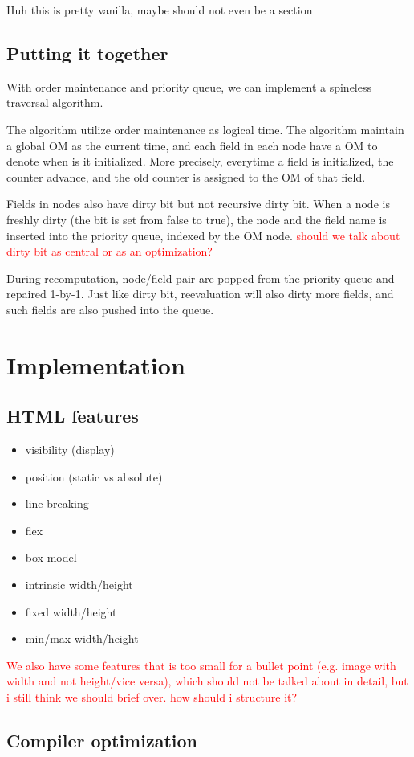 \documentclass[format=acmsmall, review=false, screen=true]{acmart}
\newcommand\todo[1]{\textcolor{red}{#1}}
\begin{document}
Huh this is pretty vanilla, maybe should not even be a section
\subsection{Putting it together}
With order maintenance and priority queue, we can implement a spineless traversal algorithm.

The algorithm utilize order maintenance as logical time. The algorithm maintain a global OM as the current time, and each field in each node have a OM to denote when is it initialized. More precisely, everytime a field is initialized, the counter advance, and the old counter is assigned to the OM of that field.

Fields in nodes also have dirty bit but not recursive dirty bit. When a node is freshly dirty (the bit is set from false to true), the node and the field name is inserted into the priority queue, indexed by the OM node. \todo{should we talk about dirty bit as central or as an optimization?}

During recomputation, node/field pair are popped from the priority queue and repaired 1-by-1. Just like dirty bit, reevaluation will also dirty more fields, and such fields are also pushed into the queue.

\section{Implementation}
\subsection{HTML features}
\begin{itemize}
	\item visibility (display)
	\item position (static vs absolute)
	\item line breaking
	\item flex
	\item box model
	\item intrinsic width/height
	\item fixed width/height
	\item min/max width/height
\end{itemize}
\todo{We also have some features that is too small for a bullet point (e.g. image with width and not height/vice versa), which should not be talked about in detail, but i still think we should brief over. how should i structure it?}
\subsection{Compiler optimization}
\end{document}
